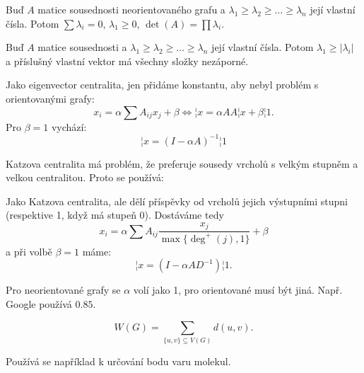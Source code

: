 \documentclass[12pt]{article}					%
\begin{document}
    \begin{lemma}
        Buď $A$ matice sousednosti neorientovaného grafu a $\lambda_1 ≥ \lambda_2 ≥ … ≥ \lambda_n$ její vlastní čísla. Potom $\sum \lambda_i = 0$, $\lambda_1 ≥ 0$, $\det(A) = \prod \lambda_i$.
    \end{lemma}

    \begin{lemma}
        Buď $A$ matice sousednosti a $\lambda_1 ≥ \lambda_2 ≥ … ≥ \lambda_n$ její vlastní čísla. Potom $\lambda_1 ≥ |\lambda_i|$ a příslušný vlastní vektor má všechny složky nezáporné.
    \end{lemma}

    \begin{definice}
        Jako eigenvector centralita, jen přidáme konstantu, aby nebyl problém s orientovanými grafy:
        $$ x_i = \alpha \sum A_{ij}x_j + \beta \Leftrightarrow ¦x = \alpha A A¦x + \beta ¦1. $$
        Pro $\beta = 1$ vychází:
        $$ ¦x = (I - \alpha A)^{-1}¦1 $$ 
    \end{definice}

    \begin{poznamka}
        Katzova centralita má problém, že preferuje sousedy vrcholů s velkým stupněm a velkou centralitou. Proto se používá:
    \end{poznamka}

    \begin{definice}[Pagerank]
        Jako Katzova centralita, ale dělí příspěvky od vrcholů jejich výstupními stupni (respektive 1, když má stupeň 0). Dostáváme tedy
        $$ x_i = \alpha \sum A_{ij}\frac{x_j}{\max\{\deg^+(j), 1\}} + \beta $$
        a při volbě $\beta = 1$ máme:
        $$ ¦x = (I - \alpha AD^{-1})¦1. $$
    \end{definice}

    \begin{poznamka}
        Pro neorientované grafy se $\alpha$ volí jako 1, pro orientované musí být jiná. Např. Google používá $0.85$.
    \end{poznamka}

    \begin{definice}
        $$ W(G) = \sum_{\{u, v\} \subseteq V(G)} d(u, v). $$

        Používá se například k určování bodu varu molekul.
    \end{definice}

\end{document}
